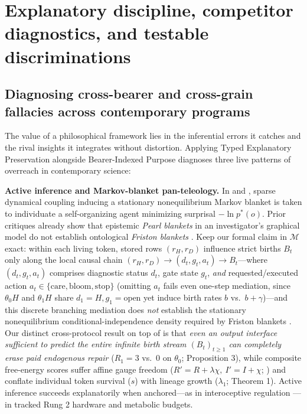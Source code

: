\documentclass[11pt,a4paper]{article}
\newcounter{none}
\begin{document}
\section{Explanatory discipline, competitor diagnostics, and testable
discriminations}\label{explanatory-discipline-competitor-diagnostics-and-testable-discriminations}

\subsection{Diagnosing cross-bearer and cross-grain fallacies across
contemporary
programs}\label{diagnosing-cross-bearer-and-cross-grain-fallacies-across-contemporary-programs}

The value of a philosophical framework lies in the inferential errors it
catches and the rival insights it integrates without distortion.
Applying Typed Explanatory Preservation alongside Bearer-Indexed Purpose
diagnoses three live patterns of overreach in contemporary science:

\textbf{Active inference and Markov-blanket pan-teleology.} In
\citet{friston2013} and \citet{parrPezzuloFriston2022}, sparse dynamical
coupling inducing a stationary nonequilibrium Markov blanket is taken to
individuate a self-organizing agent minimizing surprisal
\(-\ln p^*(o)\). Prior critiques already show that epistemic \emph{Pearl
blankets} in an investigator's graphical model do not establish
ontological \emph{Friston blankets} \citep{bruineberg2022, raja2021}.
Keep our formal claim in \(\mathcal{M}\) exact: within each living
token, stored rows \((r_H, r_D)\) influence strict births \(B_t\) only
along the local causal chain
\((r_H, r_D) \to (d_t, g_t, a_t) \to B_t\)---where \((d_t, g_t, a_t)\)
comprises diagnostic status \(d_t\), gate state \(g_t\), \emph{and}
requested/executed action
\(a_t \in \{\mathrm{care}, \mathrm{bloom}, \mathrm{stop}\}\) (omitting
\(a_t\) fails even one-step mediation, since \(\theta_0 H\) and
\(\theta_1 H\) share \(d_1 = H, g_1 = \mathrm{open}\) yet induce birth
rates \(b\) vs.~\(b+\gamma\))---and this discrete branching mediation
does \emph{not} establish the stationary nonequilibrium
conditional-independence density required by Friston blankets
\citep{friston2013, bruineberg2022}. Our distinct cross-protocol result
on top of \citet{bruineberg2022} is that \emph{even an output interface
sufficient to predict the entire infinite birth stream
\((B_t)_{t \ge 1}\) can completely erase paid endogenous repair}
(\(R_1 = 3\) vs.~\(0\) on \(\theta_0\); Proposition 3), while composite
free-energy scores suffer affine gauge freedom
(\(R' = R + \lambda\chi,\ I' = I + \chi\); \citet{biehl2021}) and
conflate individual token survival (\(s\)) with lineage growth
(\(\lambda_1\); Theorem 1). Active inference succeeds explanatorily when
anchored---as in interoceptive regulation \citep{sethTsakiris2018}---in
tracked Rung 2 hardware and metabolic budgets.
\end{document}
